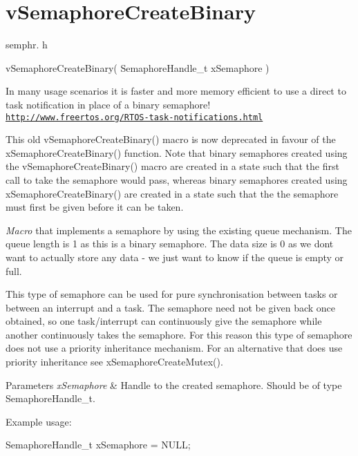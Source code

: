 \hypertarget{group__v_semaphore_create_binary}{}\section{v\+Semaphore\+Create\+Binary}
\label{group__v_semaphore_create_binary}
semphr. h 
\begin{DoxyPre}vSemaphoreCreateBinary( SemaphoreHandle\_t xSemaphore )\end{DoxyPre}


In many usage scenarios it is faster and more memory efficient to use a direct to task notification in place of a binary semaphore! \href{http://www.freertos.org/RTOS-task-notifications.html}{\tt http\+://www.\+freertos.\+org/\+R\+T\+O\+S-\/task-\/notifications.\+html}

This old v\+Semaphore\+Create\+Binary() macro is now deprecated in favour of the x\+Semaphore\+Create\+Binary() function. Note that binary semaphores created using the v\+Semaphore\+Create\+Binary() macro are created in a state such that the first call to \textquotesingle{}take\textquotesingle{} the semaphore would pass, whereas binary semaphores created using x\+Semaphore\+Create\+Binary() are created in a state such that the the semaphore must first be \textquotesingle{}given\textquotesingle{} before it can be \textquotesingle{}taken\textquotesingle{}.

{\itshape Macro} that implements a semaphore by using the existing queue mechanism. The queue length is 1 as this is a binary semaphore. The data size is 0 as we don\textquotesingle{}t want to actually store any data -\/ we just want to know if the queue is empty or full.

This type of semaphore can be used for pure synchronisation between tasks or between an interrupt and a task. The semaphore need not be given back once obtained, so one task/interrupt can continuously \textquotesingle{}give\textquotesingle{} the semaphore while another continuously \textquotesingle{}takes\textquotesingle{} the semaphore. For this reason this type of semaphore does not use a priority inheritance mechanism. For an alternative that does use priority inheritance see x\+Semaphore\+Create\+Mutex().


\begin{DoxyParams}{Parameters}
{\em x\+Semaphore} & Handle to the created semaphore. Should be of type Semaphore\+Handle\+\_\+t.\\
\hline
\end{DoxyParams}
Example usage\+: 
\begin{DoxyPre}
SemaphoreHandle\_t xSemaphore = NULL;\end{DoxyPre}



